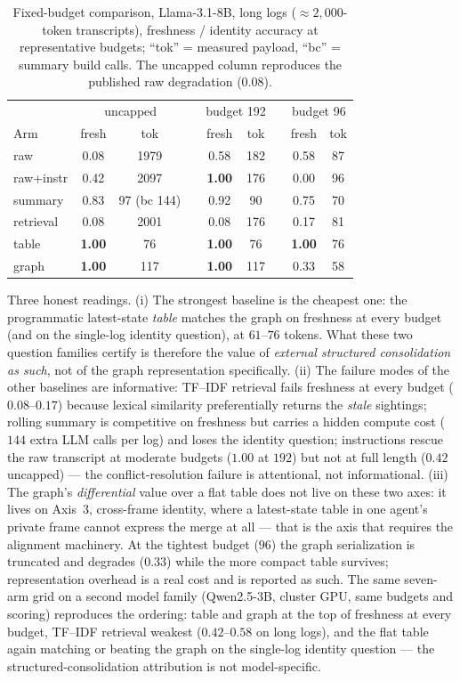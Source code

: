 \documentclass{article}
\begin{document}
\begin{table}[h]
\caption{Fixed-budget comparison, Llama-3.1-8B, long logs
(${\approx}2{,}000$-token transcripts), freshness / identity accuracy at
representative budgets; ``tok'' = measured payload, ``bc'' = summary build
calls. The uncapped column reproduces the published raw degradation
($0.08$).}
\label{p4:tab:ctx-baselines}
\centering
\small
\begin{tabular}{l cc c cc c cc}
\toprule
 & \multicolumn{2}{c}{uncapped} & & \multicolumn{2}{c}{budget 192} & & \multicolumn{2}{c}{budget 96} \\
Arm & fresh & tok & & fresh & tok & & fresh & tok \\
\midrule
raw            & 0.08 & 1979 & & 0.58 & 182 & & 0.58 & 87 \\
raw+instr      & 0.42 & 2097 & & \textbf{1.00} & 176 & & 0.00 & 96 \\
summary        & 0.83 & 97 (bc 144)  & & 0.92 & 90 & & 0.75 & 70 \\
retrieval      & 0.08 & 2001 & & 0.08 & 176 & & 0.17 & 81 \\
table          & \textbf{1.00} & 76 & & \textbf{1.00} & 76 & & \textbf{1.00} & 76 \\
graph          & \textbf{1.00} & 117 & & \textbf{1.00} & 117 & & 0.33 & 58 \\
\bottomrule
\end{tabular}
\end{table}

Three honest readings. (i) The strongest baseline is the cheapest one: the
programmatic latest-state \emph{table} matches the graph on freshness at
every budget (and on the single-log identity question), at $61$--$76$
tokens. What these two question families certify is therefore the value of
\emph{external structured consolidation as such}, not of the graph
representation specifically. (ii) The failure modes of the other baselines
are informative: TF--IDF retrieval fails freshness at every budget
($0.08$--$0.17$) because lexical similarity preferentially returns the
\emph{stale} sightings; rolling summary is competitive on freshness but
carries a hidden compute cost ($144$ extra LLM calls per log) and loses the
identity question; instructions rescue the raw transcript at moderate
budgets ($1.00$ at $192$) but not at full length ($0.42$ uncapped) --- the
conflict-resolution failure is attentional, not informational. (iii) The
graph's \emph{differential} value over a flat table does not live on these
two axes: it lives on Axis~3, cross-frame identity, where a
latest-state table in one agent's private frame cannot express the merge at
all --- that is the axis that requires the alignment machinery. At the
tightest budget ($96$) the graph serialization is truncated and degrades
($0.33$) while the more compact table survives; representation overhead is
a real cost and is reported as such. The same seven-arm grid on a
second model family (Qwen2.5-3B, cluster GPU, same budgets and
scoring) reproduces the ordering: table and graph at the top of
freshness at every budget, TF--IDF retrieval weakest
($0.42$--$0.58$ on long logs), and the flat table again matching or
beating the graph on the single-log identity question --- the
structured-consolidation attribution is not model-specific.
\end{document}
